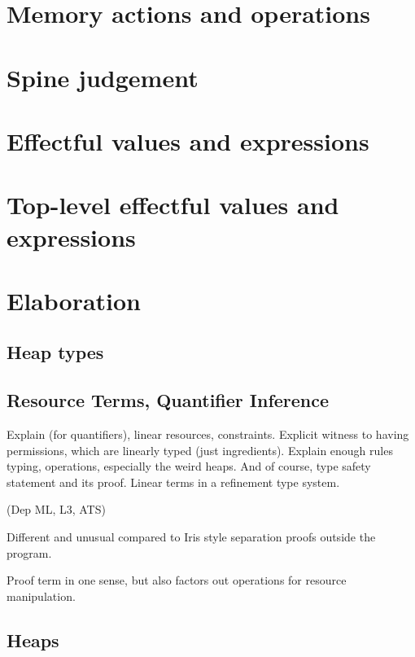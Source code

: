 \section{Memory actions and operations}

\section{Spine judgement}

\section{Effectful values and expressions}

\section{Top-level effectful values and expressions}

\section{Elaboration}


\subsection{Heap types}\label{subsec:heap-types}

\subsection{Resource Terms, Quantifier Inference}\label{subsec:resq-inf}

Explain  (for quantifiers), linear resources, constraints.
Explicit witness to having permissions, which are linearly typed (just ingredients).
Explain enough rules \textemdash{} typing, operations, especially the weird heaps.
And of course, type safety statement and its proof.
Linear terms in a refinement type system.

(Dep ML, L3, ATS)

Different and unusual compared to Iris style \textemdash{} separation proofs outside the program.

Proof term in one sense, but also factors out operations for resource manipulation.

\subsection{Heaps}


